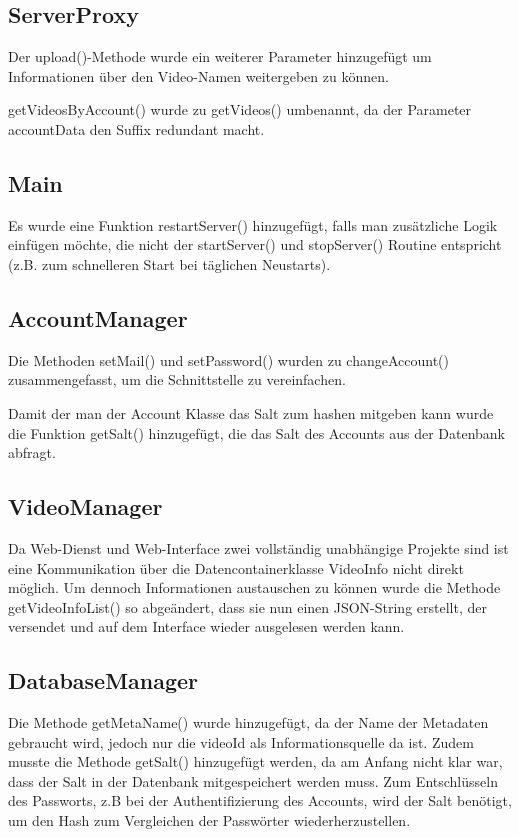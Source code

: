 \subsection{ServerProxy}
Der upload()-Methode wurde ein weiterer Parameter hinzugefügt um Informationen über den Video-Namen weitergeben zu können.  \par  

getVideosByAccount() wurde zu getVideos() umbenannt, da der Parameter accountData den Suffix redundant macht.

\subsection{Main}
Es wurde eine Funktion restartServer() hinzugefügt, falls man zusätzliche Logik einfügen möchte, die nicht der startServer() und stopServer() Routine entspricht (z.B. zum schnelleren Start bei täglichen Neustarts).

\subsection{AccountManager}
Die Methoden setMail() und setPassword() wurden zu changeAccount() zusammengefasst, um die Schnittstelle zu vereinfachen.  \par  

Damit der man der Account Klasse das Salt zum hashen mitgeben kann wurde die Funktion getSalt() hinzugefügt, die das Salt des Accounts aus der Datenbank abfragt.

\subsection{VideoManager} \label{sec:VideoManager}
Da Web-Dienst und Web-Interface zwei vollständig unabhängige Projekte sind ist eine Kommunikation über die Datencontainerklasse VideoInfo nicht direkt möglich. Um dennoch Informationen austauschen zu können wurde die Methode getVideoInfoList() so abgeändert, dass sie nun einen JSON-String erstellt, der versendet und auf dem Interface wieder ausgelesen werden kann.

\subsection{DatabaseManager}
Die Methode getMetaName() wurde hinzugefügt, da der Name der Metadaten gebraucht wird, jedoch nur die videoId als Informationsquelle da ist. Zudem musste die Methode getSalt() hinzugefügt werden, da am Anfang nicht klar war, dass der Salt in der Datenbank mitgespeichert werden muss. Zum Entschlüsseln des Passworts, z.B bei der Authentifizierung des Accounts, wird der Salt benötigt, um den Hash zum Vergleichen der Passwörter wiederherzustellen.

